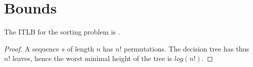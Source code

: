 \section{Bounds}
\label{tree:sorting:bounds}

\begin{theorem}
The ITLB for the sorting problem is .
\end{theorem}

\begin{proof}
A sequence $s$ of length $n$ has $n!$ permutations. The decision tree has thus $n!$ leaves, hence the worst minimal height of the tree is $log(n!)$.
\end{proof}